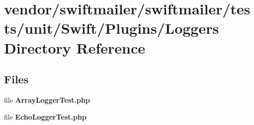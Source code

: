 \section{vendor/swiftmailer/swiftmailer/tests/unit/\+Swift/\+Plugins/\+Loggers Directory Reference}
\label{dir_0157d5d94101419d32aee5b8e5def879}
\subsection*{Files}
\begin{DoxyCompactItemize}
\item 
file {\bf Array\+Logger\+Test.\+php}
\item 
file {\bf Echo\+Logger\+Test.\+php}
\end{DoxyCompactItemize}
